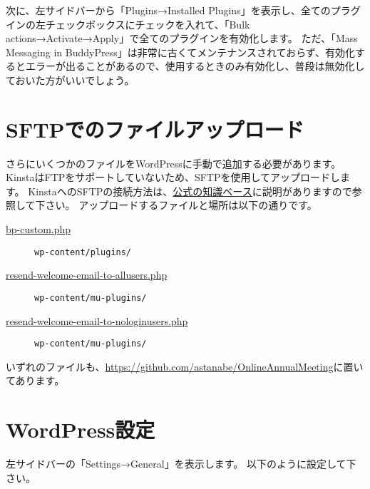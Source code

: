 \documentclass[titlepage,10pt,a4paper,uplatex]{jsbook}
\begin{document}
次に、左サイドバーから「Plugins→Installed Plugins」を表示し、全てのプラグインの左チェックボックスにチェックを入れて、「Bulk actions→Activate→Apply」で全てのプラグインを有効化します。
ただ、「Mass Messaging in BuddyPress」は非常に古くてメンテナンスされておらず、有効化するとエラーが出ることがあるので、使用するときのみ有効化し、普段は無効化しておいた方がいいでしょう。

\section{SFTPでのファイルアップロード}

さらにいくつかのファイルをWordPressに手動で追加する必要があります。
KinstaはFTPをサポートしていないため、SFTPを使用してアップロードします。
KinstaへのSFTPの接続方法は、\href{https://kinsta.com/jp/knowledgebase/how-to-use-sftp/}{公式の知識ベース}に説明がありますので参照して下さい。
アップロードするファイルと場所は以下の通りです。

\begin{description}
\item[\href{https://github.com/astanabe/OnlineAnnualMeeting/blob/main/bp-custom.php}{bp-custom.php}] \texttt{wp-content/plugins/}
\item[\href{https://github.com/astanabe/OnlineAnnualMeeting/blob/main/resend-welcome-email-to-allusers.php}{resend-welcome-email-to-allusers.php}] \texttt{wp-content/mu-plugins/}
\item[\href{https://github.com/astanabe/OnlineAnnualMeeting/blob/main/resend-welcome-email-to-nologinusers.php}{resend-welcome-email-to-nologinusers.php}] \texttt{wp-content/mu-plugins/}
\end{description}

いずれのファイルも、\url{https://github.com/astanabe/OnlineAnnualMeeting}に置いてあります。

\section{WordPress設定}

左サイドバーの「Settings→General」を表示します。
以下のように設定して下さい。
\end{document}
